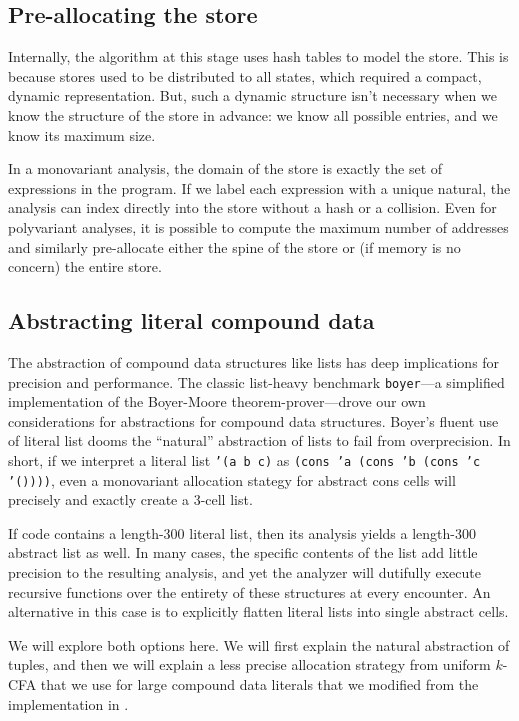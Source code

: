\documentclass[preprint,onecolumn,9pt]{sigplanconf} %
\begin{document}
\subsection{Pre-allocating the store}

Internally, the algorithm at this stage uses hash tables to model the store.
%
This is because stores used to be distributed to all states, which
required a compact, dynamic representation.
%
But, such a dynamic structure isn't necessary when we know the
structure of the store in advance: we know all possible entries, and
we know its maximum size.

In a monovariant analysis, the domain of the store is
exactly the set of expressions in the program.
%
If we label each expression with a unique natural, the analysis can
index directly into the store without a hash or a collision.
%
Even for polyvariant analyses, it is possible to compute the maximum
number of addresses and similarly pre-allocate either the spine of the
store or (if memory is no concern) the entire store.

\subsection{Abstracting literal compound data}

The abstraction of compound data structures like lists has deep implications 
for precision and performance.
%
The classic list-heavy benchmark {\tt boyer}---a simplified implementation
of the Boyer-Moore theorem-prover---drove our own considerations for
abstractions for compound data structures.
%
Boyer's fluent use of literal list dooms the ``natural'' abstraction
of lists to fail from overprecision.
%
In short, if we interpret a literal list {\tt '(a b c)} as {\tt (cons 'a (cons 'b
(cons 'c '())))}, even a monovariant allocation stategy for abstract
cons cells will precisely and exactly create a 3-cell list.

If code contains a length-300 literal list, then its analysis yields a length-300 abstract
list as well.
%
In many cases, the specific contents of the list add little precision
to the resulting analysis, and yet the analyzer will dutifully execute
recursive functions over the entirety of these structures at every
encounter.
%
An alternative in this case is to explicitly flatten literal lists
into single abstract cells.

We will explore both options here.
%
We will first explain the natural abstraction of tuples, and then we
will explain a less precise allocation strategy from uniform $k$-CFA
that we use for large compound data literals that we modified from the
implementation in \citep{dvanhorn:wright-jagannathan-toplas98}.
\end{document}
